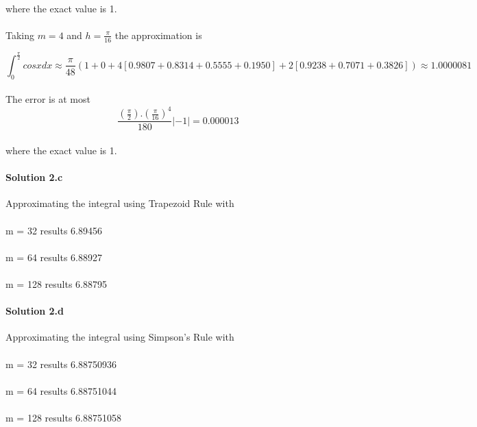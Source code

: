 \documentclass[11pt]{article}
\begin{document}
\paragraph{} where the exact value is 1.

\paragraph{} Taking $m=4$ and $h= \frac{\pi}{16}$ the approximation is 

\begin{equation*}
\int_{0}^{\frac{\pi}{2}} cosx dx \approx \frac{\pi}{48} (1 + 0 + 4[0.9807 + 0.8314 + 0.5555 + 0.1950] + 2[0.9238 + 0.7071 + 0.3826]) \approx 1.0000081
\end{equation*}
\paragraph{} The error is at most
\begin{equation*}
\frac{(\frac{\pi}{2}).(\frac{\pi}{16})^4}{180} \left|-1\right| = 0.000013
\end{equation*}
\paragraph{} where the exact value is 1.
\newpage
\paragraph{Solution 2.c} Approximating the integral using Trapezoid Rule with 
\paragraph{} m = 32   results 6.89456
\paragraph{} m = 64   results 6.88927
\paragraph{} m = 128 results 6.88795

\paragraph{Solution 2.d} Approximating the integral using Simpson's Rule with 
\paragraph{} m = 32   results 6.88750936
\paragraph{} m = 64   results 6.88751044
\paragraph{} m = 128  results 6.88751058
\end{document}
